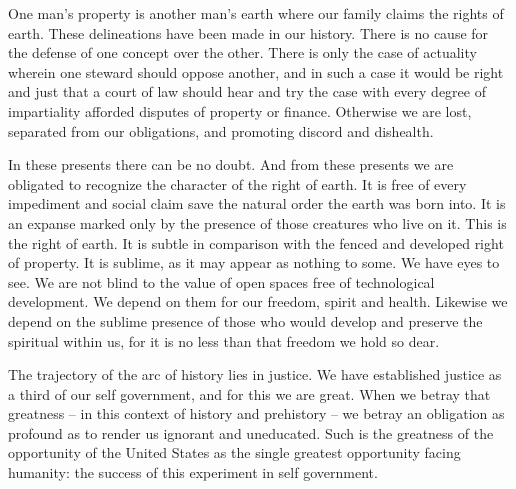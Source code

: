 \documentclass{article}
\begin{document}
One man's property is another man's earth where our family claims the
rights of earth.  These delineations have been made in our history.
There is no cause for the defense of one concept over the other.
There is only the case of actuality wherein one steward should oppose
another, and in such a case it would be right and just that a court of
law should hear and try the case with every degree of impartiality
afforded disputes of property or finance.  Otherwise we are lost,
separated from our obligations, and promoting discord and dishealth.

In these presents there can be no doubt.  And from these presents we
are obligated to recognize the character of the right of earth.  It is
free of every impediment and social claim save the natural order the
earth was born into.  It is an expanse marked only by the presence of
those creatures who live on it.  This is the right of earth.  It is
subtle in comparison with the fenced and developed right of property.
It is sublime, as it may appear as nothing to some.  We have eyes to
see.  We are not blind to the value of open spaces free of
technological development.  We depend on them for our freedom, spirit
and health.  Likewise we depend on the sublime presence of those who
would develop and preserve the spiritual within us, for it is no less
than that freedom we hold so dear.  

The trajectory of the arc of history lies in justice.  We have
established justice as a third of our self government, and for this we
are great.  When we betray that greatness -- in this context of
history and prehistory -- we betray an obligation as profound as to
render us ignorant and uneducated.  Such is the greatness of the
opportunity of the United States as the single greatest opportunity
facing humanity: the success of this experiment in self government.  
\end{document}
